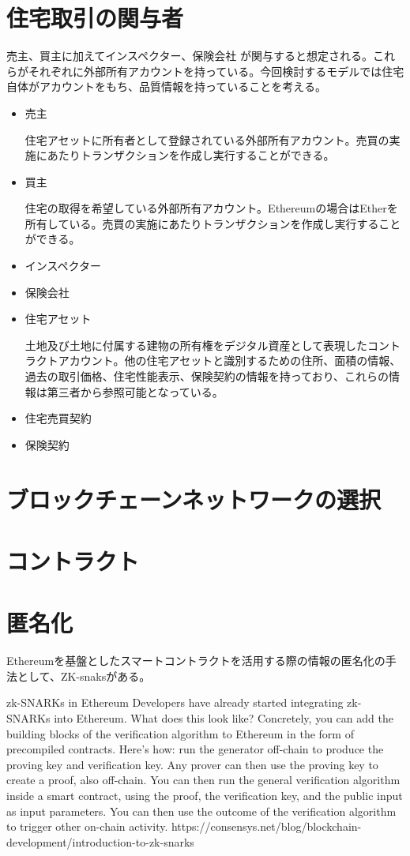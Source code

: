 \documentclass[a4paper,fontsize=11pt,report,notitlepage,line_length=38zw,number_of_lines=40]{jlreq}
\begin{document}
\section{住宅取引の関与者}
売主、買主に加えてインスペクター、保険会社%
が関与すると想定される。これらがそれぞれに外部所有アカウントを持っている。今回検討するモデルでは住宅自体がアカウントをもち、品質情報を持っていることを考える。
\begin{itemize}
	\item 売主
    \par 住宅アセットに所有者として登録されている外部所有アカウント。売買の実施にあたりトランザクションを作成し実行することができる。
    \item 買主
    \par 住宅の取得を希望している外部所有アカウント。Ethereumの場合はEtherを所有している。売買の実施にあたりトランザクションを作成し実行することができる。
    \item インスペクター
    \par 
    \item 保険会社
	\item 住宅アセット	
	\par 土地及び土地に付属する建物の所有権をデジタル資産として表現したコントラクトアカウント。他の住宅アセットと識別するための住所、面積の情報、過去の取引価格、住宅性能表示、保険契約の情報を持っており、これらの情報は第三者から参照可能となっている。
	\item 住宅売買契約
	\item 保険契約

\end{itemize}


\section{ブロックチェーンネットワークの選択}


\section{コントラクト}

\section{匿名化}
Ethereumを基盤としたスマートコントラクトを活用する際の情報の匿名化の手法として、ZK-snaksがある。

zk-SNARKs in Ethereum
Developers have already started integrating zk-SNARKs into Ethereum. What does this look like? Concretely, you can add the building blocks of the verification algorithm to Ethereum in the form of precompiled contracts. Here’s how: run the generator off-chain to produce the proving key and verification key. Any prover can then use the proving key to create a proof, also off-chain. You can then run the general verification algorithm inside a smart contract, using the proof, the verification key, and the public input as input parameters. You can then use the outcome of the verification algorithm to trigger other on-chain activity.
https://consensys.net/blog/blockchain-development/introduction-to-zk-snarks
\end{document}

